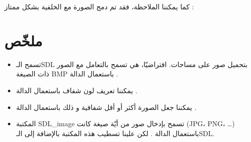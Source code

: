 كما يمكننا الملاحظة، فقد تم دمج الصورة مع الخلفية بشكل ممتاز :


\section*{ملخّص}

\begin{itemize}
	\item تسمح الـ\textenglish{SDL}
	بتحميل صور على مساحات. افتراضيّا، هي تسمح بالتعامل مع الصور ذات الصيغة
	\textenglish{BMP}
	باستعمال الدالة
	.
	\item يمكننا تعريف لون شفاف باستعمال الدالة
	.
	\item يمكننا جعل الصورة أكثر أو أقل شفافية و ذلك باستعمال الدالة 
	.
	\item المكتبة
	\textenglish{SDL\_image}
	تسمح بإدخال صور من أيّة صيغة كانت
	(\textenglish{JPG}، \textenglish{PNG}، \dots)
	باستعمال الدالة
	.
	لكن علينا تسطيب هذه المكتبة بالإضافة إلى الـ\textenglish{SDL}.
\end{itemize}
